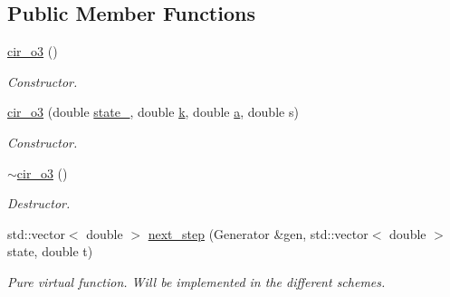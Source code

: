 \subsection*{Public Member Functions}
\begin{DoxyCompactItemize}
\item 
\hyperlink{classcir__o3_a73106636672bfd0236b2272e480a521c}{cir\+\_\+o3} ()\hypertarget{classcir__o3_a73106636672bfd0236b2272e480a521c}{}\label{classcir__o3_a73106636672bfd0236b2272e480a521c}

\begin{DoxyCompactList}\small\item\em Constructor. \end{DoxyCompactList}\item 
\hyperlink{classcir__o3_adda0ca25019f56ef8987af11c1b6a9ad}{cir\+\_\+o3} (double \hyperlink{classprocess_ab4d01c8ea2e9c8285134786d32ae42aa}{state\+\_}, double \hyperlink{classcir_aa5b05ff03ee8bb587ea94426a9ce704b}{k}, double \hyperlink{classcir_a358578305ea60d31c00546233304651c}{a}, double s)\hypertarget{classcir__o3_adda0ca25019f56ef8987af11c1b6a9ad}{}\label{classcir__o3_adda0ca25019f56ef8987af11c1b6a9ad}

\begin{DoxyCompactList}\small\item\em Constructor. \end{DoxyCompactList}\item 
\hyperlink{classcir__o3_a8d51e7530a1170a835b548b601746537}{$\sim$cir\+\_\+o3} ()\hypertarget{classcir__o3_a8d51e7530a1170a835b548b601746537}{}\label{classcir__o3_a8d51e7530a1170a835b548b601746537}

\begin{DoxyCompactList}\small\item\em Destructor. \end{DoxyCompactList}\item 
std\+::vector$<$ double $>$ \hyperlink{classcir__o3_a77d0f79c0634f1d6cd19017e56eab451}{next\+\_\+step} (Generator \&gen, std\+::vector$<$ double $>$ state, double t)\hypertarget{classcir__o3_a77d0f79c0634f1d6cd19017e56eab451}{}\label{classcir__o3_a77d0f79c0634f1d6cd19017e56eab451}

\begin{DoxyCompactList}\small\item\em Pure virtual function. Will be implemented in the different schemes. \end{DoxyCompactList}\end{DoxyCompactItemize}
